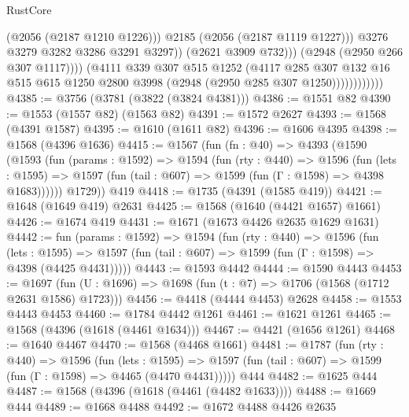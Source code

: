 \begin{lexlean}{RustCore}
\begin{coremodule}
                                    (@2056 (@2187 @1210 @1226)))
                                  @2185
                                  (@2056 (@2187 @1119 @1227)))
                                @3276
                                @3279
                                @3282
                                @3286
                                @3291
                                @3297))
                            (@2621 @3909 @732)))
                        (@2948 (@2950 @266 @307 @1117))))
                    (@4111
                      @339
                      @307
                      @515
                      @1252
                      (@4117
                        @285
                        @307
                        @132
                        @16
                        @515
                        @615
                        @1250
                        @2800
                        @3998
                        (@2948 (@2950 @285 @307 @1250))))))))))))
@4385 := @3756 (@3781 (@3822 (@3824 @4381)))
@4386 := @1551 @82
@4390 := @1553 (@1557 @82) (@1563 @82)
@4391 := @1572 @2627
@4393 := @1568 (@4391 @1587)
@4395 := @1610 (@1611 @82)
@4396 := @1606 @4395
@4398 := @1568 (@4396 @1636)
@4415 := @1567
    (fun (fn : @40) =>
    @4393
      (@1590
        (@1593
          (fun (params : @1592) =>
          @1594
            (fun (rty : @440) =>
            @1596
              (fun (lets : @1595) =>
              @1597 (fun (tail : @607) => @1599 (fun (Γ : @1598) => @4398 @1683))))))
        @1729))
    @419
@4418 := @1735 (@4391 (@1585 @419))
@4421 := @1648 (@1649 @419) @2631
@4425 := @1568 (@1640 (@4421 @1657) @1661)
@4426 := @1674 @419
@4431 := @1671 (@1673 @4426 @2635 @1629 @1631)
@4442 := fun (params : @1592) =>
  @1594
    (fun (rty : @440) =>
    @1596
      (fun (lets : @1595) =>
      @1597 (fun (tail : @607) => @1599 (fun (Γ : @1598) => @4398 (@4425 @4431)))))
@4443 := @1593 @4442
@4444 := @1590 @4443
@4453 := @1697 (fun (U : @1696) => @1698 (fun (t : @7) => @1706 (@1568 (@1712 @2631 @1586) @1723)))
@4456 := @4418 (@4444 @4453) @2628
@4458 := @1553 @4443 @4453
@4460 := @1784 @4442 @1261
@4461 := @1621 @1261
@4465 := @1568 (@4396 (@1618 (@4461 @1634)))
@4467 := @4421 (@1656 @1261)
@4468 := @1640 @4467
@4470 := @1568 (@4468 @1661)
@4481 := @1787
    (fun (rty : @440) =>
    @1596
      (fun (lets : @1595) =>
      @1597 (fun (tail : @607) => @1599 (fun (Γ : @1598) => @4465 (@4470 @4431)))))
    @444
@4482 := @1625 @444
@4487 := @1568 (@4396 (@1618 (@4461 (@4482 @1633))))
@4488 := @1669 @444
@4489 := @1668 @4488
@4492 := @1672 @4488 @4426 @2635

\end{coremodule}
\end{lexlean}
